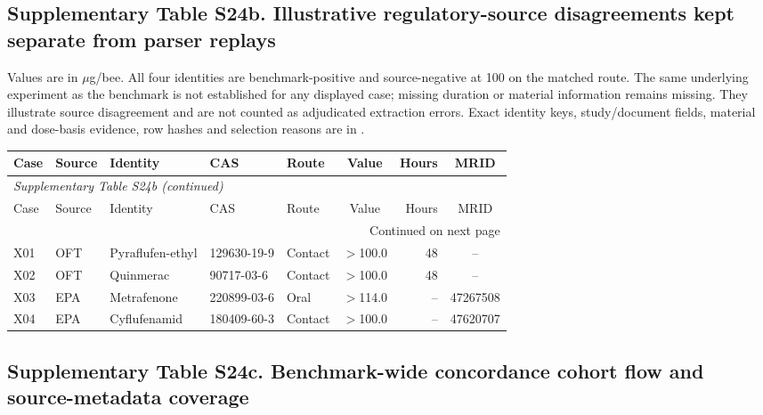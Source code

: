 \subsection*{Supplementary Table S24b. Illustrative regulatory-source disagreements kept separate from parser replays}

Values are in $\mu$g/bee. All four identities are benchmark-positive and source-negative at 100 on the matched route. The same underlying experiment as the benchmark is not established for any displayed case; missing duration or material information remains missing. They illustrate source disagreement and are not counted as adjudicated extraction errors. Exact identity keys, study/document fields, material and dose-basis evidence, row hashes and selection reasons are in .

\begingroup\small\setlength{\tabcolsep}{4pt}

\begin{longtable}{lllllcrc}

\toprule Case & Source & Identity & CAS & Route & Value & Hours & MRID \\ \midrule\endfirsthead

\multicolumn{8}{l}{\textit{Supplementary Table S24b (continued)}} \\

\toprule Case & Source & Identity & CAS & Route & Value & Hours & MRID \\ \midrule\endhead

\midrule\multicolumn{8}{r}{Continued on next page}\\\endfoot\bottomrule\endlastfoot

X01 & OFT & Pyraflufen-ethyl & 129630-19-9 & Contact & $>$100.0 & 48 & -- \\

X02 & OFT & Quinmerac & 90717-03-6 & Contact & $>$100.0 & 48 & -- \\

X03 & EPA & Metrafenone & 220899-03-6 & Oral & $>$114.0 & -- & 47267508 \\

X04 & EPA & Cyflufenamid & 180409-60-3 & Contact & $>$100.0 & -- & 47620707 \\

\end{longtable}\endgroup

\subsection*{Supplementary Table S24c. Benchmark-wide concordance cohort flow and source-metadata coverage}

